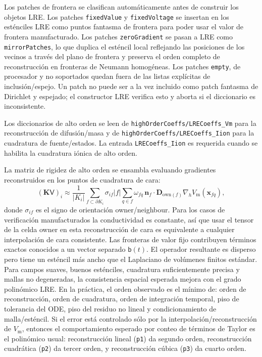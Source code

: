 \documentclass[11pt,a4paper]{article}
\newcommand{\code}[1]{\texttt{\small #1}}
\newcommand{\Vm}{V_{\text{m}}}
\newcommand{\Dten}{\mathbf{D}}
\newcommand{\grad}{\nabla}
\newcommand{\Kstif}{\mathbf{K}}
\begin{document}
Los patches de frontera se clasifican automáticamente antes de construir los objetos LRE.
Los patches \code{fixedValue} y \code{fixedVoltage} se insertan en los esténciles LRE como
puntos fantasma de frontera para poder usar el valor de frontera manufacturado. Los patches
\code{zeroGradient} se pasan a LRE como \code{mirrorPatches}, lo que duplica el esténcil
local reflejando las posiciones de los vecinos a través del plano de frontera y preserva el
orden completo de reconstrucción en fronteras de Neumann homogéneas. Los patches
\code{empty}, de procesador y no soportados quedan fuera de las listas explícitas de
inclusión/espejo. Un patch no puede ser a la vez incluido como patch fantasma de Dirichlet
y espejado; el constructor LRE verifica esto y aborta si el diccionario es inconsistente.

Los diccionarios de alto orden se leen de \code{highOrderCoeffs/LRECoeffs\_Vm} para la
reconstrucción de difusión/masa y de \code{highOrderCoeffs/LRECoeffs\_Iion} para la
cuadratura de fuente/estados. La entrada \code{LRECoeffs\_Iion} es requerida cuando se
habilita la cuadratura iónica de alto orden.

La matriz de rigidez de alto orden se ensambla evaluando gradientes reconstruidos en los
puntos de cuadratura de cara:
\begin{equation}
  (\Kstif\mathsf{V})_i
  \approx
  \frac{1}{|K_i|}
  \sum_{f\subset\partial K_i}\sigma_{if}
  |f|\sum_{q\in f}\omega_{fq}\,
  \mathbf{n}_f\cdot\Dten_{\mathrm{own}(f)}
  \grad_h \Vm(\mathbf{x}_{fq}),
  \label{eq:ho-face}
\end{equation}
donde $\sigma_{if}$ es el signo de orientación owner/neighbour. Para los casos de
verificación manufacturados la conductividad es constante, así que usar el tensor de la
celda owner en esta reconstrucción de cara es equivalente a cualquier interpolación de cara
consistente. Las fronteras de valor fijo contribuyen términos exactos conocidos a un vector
separado $\mathsf{b}(t)$. El operador resultante es disperso pero tiene un esténcil más
ancho que el Laplaciano de volúmenes finitos estándar. Para campos suaves, buenos
esténciles, cuadratura suficientemente precisa y mallas no degeneradas, la consistencia
espacial esperada mejora con el grado polinómico LRE. En la práctica, el orden observado es
el mínimo de: orden de reconstrucción, orden de cuadratura, orden de integración temporal,
piso de tolerancia del ODE, piso del residuo no lineal y condicionamiento de malla/esténcil.
Si el error está controlado sólo por la interpolación/reconstrucción de $\Vm$, entonces el
comportamiento esperado por conteo de términos de Taylor es el polinómico usual: reconstrucción
lineal (\code{p1}) da segundo orden, reconstrucción cuadrática (\code{p2}) da tercer orden, y
reconstrucción cúbica (\code{p3}) da cuarto orden.
\end{document}
